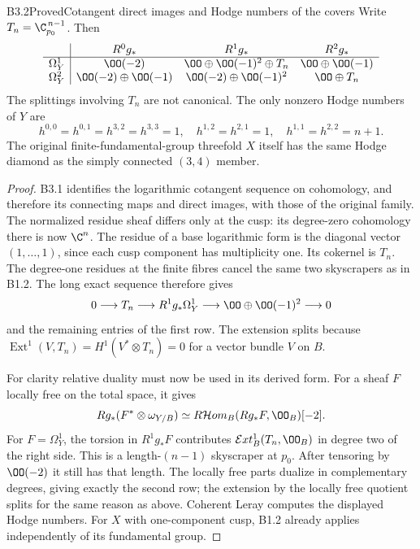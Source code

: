 \begin{claim}{B3.2}{Proved}{Cotangent direct images and Hodge numbers of the covers}
Write $T_n=\C_{p_0}^{\,n-1}$. Then
\[
\begin{array}{c|ccc}
 &R^0g_*&R^1g_*&R^2g_*\\\hline
\Omega^1_Y&\OO(-2)&\OO\oplus\OO(-1)^2\oplus T_n&\OO\oplus\OO(-1)\\
\Omega^2_Y&\OO(-2)\oplus\OO(-1)&\OO(-2)\oplus\OO(-1)^2&\OO\oplus T_n
\end{array}
\]
The splittings involving $T_n$ are not canonical.
The only nonzero Hodge numbers of $Y$ are
\[
h^{0,0}=h^{0,1}=h^{3,2}=h^{3,3}=1,\quad
h^{1,2}=h^{2,1}=1,\quad h^{1,1}=h^{2,2}=n+1.
\]
The original finite-fundamental-group threefold $X$ itself has the
same Hodge diamond as the simply connected $(3,4)$ member.
\end{claim}
\begin{proof}
B3.1 identifies the logarithmic cotangent sequence on cohomology,
and therefore its connecting maps and direct images, with those of
the original family. The normalized residue sheaf differs only at
the cusp: its degree-zero cohomology there is now $\C^n$.
The residue of a base logarithmic form is the diagonal vector
$(1,\ldots,1)$, since each cusp component has multiplicity one.
Its cokernel is $T_n$. The degree-one residues at the finite fibres
cancel the same two skyscrapers as in B1.2. The long exact sequence
therefore gives
\[
0\longrightarrow T_n\longrightarrow R^1g_*\Omega^1_Y
\longrightarrow\OO\oplus\OO(-1)^2\longrightarrow0
\]
and the remaining entries of the first row. The extension splits
because $\operatorname{Ext}^1(V,T_n)=H^1(V^*\otimes T_n)=0$
for a vector bundle $V$ on $B$.

For clarity relative duality must now be used in its derived form.
For a sheaf $F$ locally free on the total space, it gives
\[
Rg_*(F^*\otimes\omega_{Y/B})
\simeq R\mathcal Hom_B(Rg_*F,\OO_B)[-2].
\]
For $F=\Omega^1_Y$, the torsion in $R^1g_*F$ contributes
$\mathcal Ext^1_B(T_n,\OO_B)$ in degree two of the right side.
This is a length-$(n-1)$ skyscraper at $p_0$. After tensoring by
$\OO(-2)$ it still has that length. The locally free parts dualize
in complementary degrees, giving exactly the second row; the
extension by the locally free quotient splits for the same reason
as above. Coherent Leray computes the displayed Hodge numbers.
For $X$ with one-component cusp, B1.2 already applies independently
of its fundamental group.
\end{proof}
